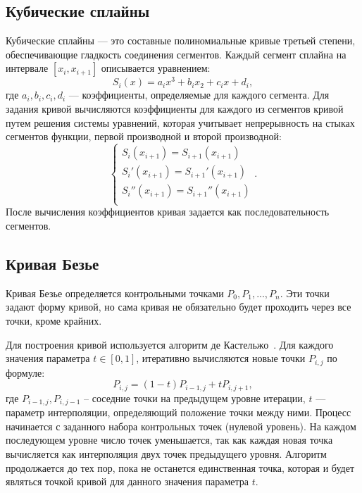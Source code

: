 \subsection{Кубические сплайны}
Кубические сплайны --- это составные полиномиальные кривые третьей степени, обеспечивающие гладкость соединения сегментов. Каждый сегмент сплайна на интервале $[x_i, x_{i+1}]$ описывается уравнением:
\begin{equation}
    S_i(x) = a_ix^3 + b_ix_2 + c_ix + d_i,
\end{equation}
где $a_i, b_i, c_i, d_i$ --- коэффициенты, определяемые для каждого сегмента. Для задания кривой вычисляются коэффициенты для каждого из сегментов кривой путем решения системы уравнений, которая учитывает непрерывность на стыках сегментов функции, первой производной и второй производной:
\begin{equation}
    \begin{cases}
    S_i(x_{i+1}) = S_{i+1}(x_{i+1}) \\
    S_i'(x_{i+1}) = S_{i+1}'(x_{i+1}) \\
    S_i''(x_{i+1}) = S_{i+1}''(x_{i+1}) \\
    \end{cases}.
\end{equation}
После вычисления коэффициентов кривая задается как последовательность сегментов.

\subsection{Кривая Безье}
Кривая Безье определяется контрольными точками $P_0, P_1,...,P_n$. Эти точки задают форму кривой, но сама кривая не обязательно будет проходить через все точки, кроме крайних. 

Для построения кривой используется алгоритм де Кастельжо~\cite{кривые_безье}. Для каждого значения параметра $t \in [0, 1]$, итеративно вычисляются новые точки $P_{i,j}$ по формуле:
\begin{equation}
    P_{i,j} = (1 -t)P_{i-1,j} + tP_{i,j+1},
\end{equation}
где $P_{i-1,j}, P_{i,j-1}$ -- соседние точки на предыдущем уровне итерации, $t$ --- параметр интерполяции, определяющий положение точки между ними. Процесс начинается с заданного набора контрольных точек (нулевой уровень). На каждом последующем уровне число точек уменьшается, так как каждая новая точка вычисляется как интерполяция двух точек предыдущего уровня. Алгоритм продолжается до тех пор, пока не останется единственная точка, которая и будет являться точкой кривой для данного значения параметра $t$. 

